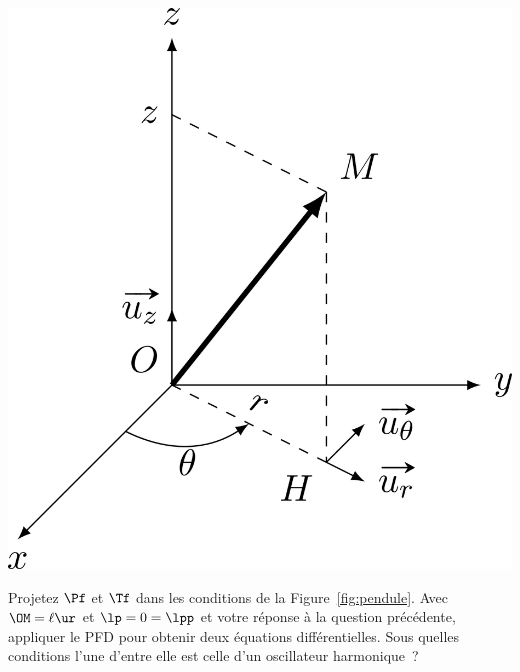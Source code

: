 \documentclass[a4paper, 10pt, final, garamond]{book}
\begin{document}
\begin{enumerate}[label=\sqenumi]
\begin{minipage}[t]{.20\linewidth}
\begin{center}
{			}{
				\includegraphics[width=\linewidth]{cyl_rep}
			}
			\vspace{-15pt}
			\captionsetup{justification=centering}
		\end{center}
	\end{minipage}
	\noindent
	\begin{minipage}[t]{.70\linewidth}
		Projetez $\Pf$ et $\Tf$ dans les conditions de la Figure~\ref{fig:pendule}.
		Avec $\OM = \ell\ur$ et $\lp = 0 = \lpp$ et votre réponse à la question
		précédente, appliquer le PFD pour obtenir deux équations différentielles. Sous
		quelles conditions l'une d'entre elle est celle d'un oscillateur harmonique~?
		\smallbreak
\end{minipage}
\end{enumerate}
\end{document}
